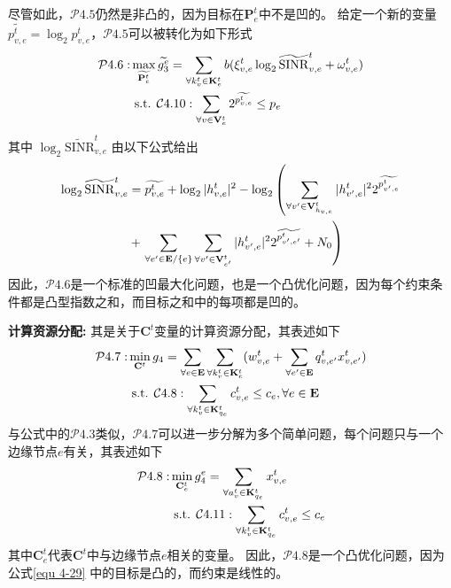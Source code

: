 尽管如此，$\mathcal{P}4.5$仍然是非凸的，因为目标在$\mathbf{P}_{e}^{t}$中不是凹的。
给定一个新的变量$\widetilde{p_{v, e}^t} = \log _{2} {p}_{v, e}^t$，$\mathcal{P}4.5$可以被转化为如下形式
\begin{align}
	\mathcal{P}4.6: & \max_{\widetilde{\mathbf{{P}}_{e}^{t}}}  \widetilde{g_3^{e}}= \sum_{\forall k_{v}^{t} \in \mathbf{K}_{e}^{t}} {b ( \xi_{v, e}^{t} \log _{2}\mathrm{\widetilde{SINR}}_{v, e}^t + \omega_{v, e}^{t} ) } \notag \\
	&\text { s.t. } \mathcal{C}4.10: \sum_{\forall v \in \mathbf{V}_{e}^{t}} 2^{\widetilde{p_{v, e}^t}} \leq p_{e}  
\end{align}
其中 $\log _{2}\mathrm{\widetilde{SINR}}_{v, e}^t$ 由以下公式给出
\begin{align}
	\log _{2}\mathrm{\widetilde{SINR}}_{v, e}^t &= \widetilde{p_{v, e}^t} + \log _{2} |h_{v, e}^t| ^{2} - \log _{2} \left( \sum\limits_{\forall v^{\prime} \in \mathbf{V}_{h_{v, e}}^{t}} |h_{v^{\prime}, e}^t|^2 2^{\widetilde{p_{v^{\prime}, e}^{t}}} \right. \notag \\
	&+ \left. \sum\limits_{\forall e^{\prime} \in \mathbf{E} / \{e\}} \sum\limits_{\forall v^{\prime} \in \mathbf{V}_{e^{\prime}}^{t}} |h_{v^{\prime}, e}^t|^2 2^{\widetilde{p_{v^{\prime}, e^{\prime}}^{t}}} + N_{0}\right)
\end{align}
\noindent 因此，$\mathcal{P}4.6$是一个标准的凹最大化问题，也是一个凸优化问题，因为每个约束条件都是凸型指数之和，而目标之和中的每项都是凹的。

\textbf{计算资源分配:} 其是关于$\mathbf{C}^{t}$变量的计算资源分配，其表述如下
\begin{align}
	\mathcal{P}4.7: &\min_{\mathbf{C}^{t}} g_4= \sum_{ \forall e \in \mathbf{E}} \sum_{\forall k_{v}^{t} \in \mathbf{K}_{e}^{t}} ( w_{v, e}^{t} + \sum_{\forall e^{\prime} \in \mathbf{E}} q_{v, e^{\prime}}^{t} x_{v, e^{\prime}}^t) \notag \\
	&\text { s.t. } \mathcal{C}4.8:  \sum_{\forall k_{v}^{t} \in {\mathbf{K}_{q_e}^{t} }} c_{v, e}^t \leq c_{e}, \forall e \in \mathbf{E}
\end{align}
与公式中的$\mathcal{P}4.3$类似，$\mathcal{P}4.7$可以进一步分解为多个简单问题，每个问题只与一个边缘节点$e$有关，其表述如下
\begin{align}
	\mathcal{P}4.8: &\min_{\mathbf{C}_{e}^{t}} g_4^e= \sum_{\forall a_{v}^{t} \in {\mathbf{K}_{q_e}^{t} }}   x_{v, e}^t \notag \\
	&\text { s.t. } \mathcal{C}4.11:  \sum_{\forall k_{v}^{t} \in {\mathbf{K}_{q_e}^{t} }} {c_{v, e}^t} \leq c_{e}
\label{equ 4-29}
\end{align}
\noindent 其中${\mathbf{C}_e^t}$代表${\mathbf{C}^{t}}$中与边缘节点$e$相关的变量。
因此，$\mathcal{P}4.8$是一个凸优化问题，因为公式\ref{equ 4-29} 中的目标是凸的，而约束是线性的。

